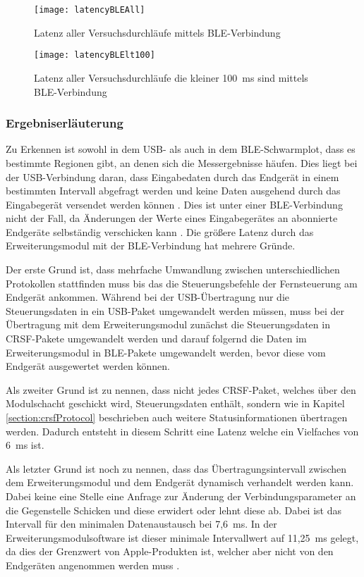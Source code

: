 \begin{figure}[H]
    \centering
    \texttt{[image: latencyBLEAll]}
    \caption{Latenz aller Versuchsdurchläufe mittels \ac{BLE}-Verbindung}
    \label{fig:latencyBLEAll}
\end{figure}

\begin{figure}[H]
    \centering
    \texttt{[image: latencyBLElt100]}
    \caption{Latenz aller Versuchsdurchläufe die kleiner 100~ms sind mittels \ac{BLE}-Verbindung}
    \label{fig:latencyBLElt100}
\end{figure}

\subsubsection{Ergebniserläuterung}
Zu Erkennen ist sowohl in dem USB- als auch in dem \ac{BLE}-Schwarmplot, dass es bestimmte Regionen gibt, an denen sich die Messergebnisse häufen. Dies liegt bei der USB-Verbindung daran, dass Eingabedaten durch das Endgerät in einem bestimmten Intervall abgefragt werden und keine Daten ausgehend durch das Eingabegerät versendet werden können \cites[S.~48f., S.~277ff.]{usb2Spec}[S.~5]{wimmerLatenzStation}. Dies ist unter einer \ac{BLE}-Verbindung nicht der Fall, da Änderungen der Werte eines Eingabegerätes an abonnierte Endgeräte selbständig verschicken kann \cite[S.~1516]{bluetoothCore}. Die größere Latenz durch das Erweiterungsmodul mit der \ac{BLE}-Verbindung hat mehrere Gründe.

Der erste Grund ist, dass mehrfache Umwandlung zwischen unterschiedlichen Protokollen stattfinden muss bis das die Steuerungsbefehle der Fernsteuerung am Endgerät ankommen. Während bei der USB-Übertragung nur die Steuerungsdaten in ein USB-Paket umgewandelt werden müssen, muss bei der Übertragung mit dem Erweiterungsmodul zunächst die Steuerungsdaten in CRSF-Pakete umgewandelt werden und darauf folgernd die Daten im Erweiterungsmodul in BLE-Pakete umgewandelt werden, bevor diese vom Endgerät ausgewertet werden können.

Als zweiter Grund ist zu nennen, dass nicht jedes CRSF-Paket, welches über den Modulschacht geschickt wird, Steuerungsdaten enthält, sondern wie in Kapitel \ref{section:crsfProtocol} beschrieben auch weitere Statusinformationen übertragen werden. Dadurch entsteht in diesem Schritt eine Latenz welche ein Vielfaches von 6~ms ist.

Als letzter Grund ist noch zu nennen, dass das Übertragungsintervall zwischen dem Erweiterungsmodul und dem Endgerät dynamisch verhandelt werden kann. Dabei keine eine Stelle eine Anfrage zur Änderung der Verbindungsparameter an die Gegenstelle Schicken und diese erwidert oder lehnt diese ab. Dabei ist das Intervall für den minimalen Datenaustausch bei 7,6~ms. In der Erweiterungsmodulsoftware ist dieser minimale Intervallwert auf 11,25~ms gelegt, da dies der Grenzwert von Apple-Produkten ist, welcher aber nicht von den Endgeräten angenommen werden muss \cite[S.~188]{appleDesignGuide}. \cite{bleConnectionParameter}


